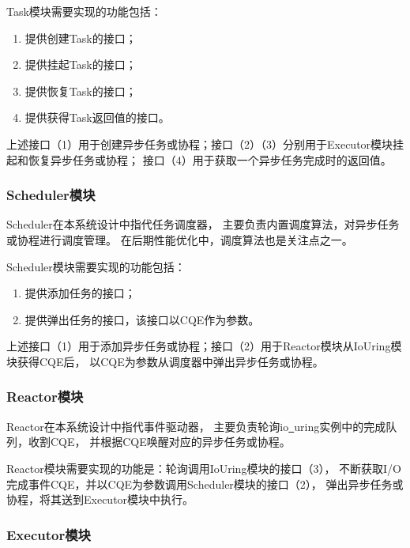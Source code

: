 \documentclass[supercite]{HustGraduPaper}
\theoremstyle{definition}
\begin{document}
Task模块需要实现的功能包括：

\begin{enumerate}
  \item 提供创建Task的接口；
  \item 提供挂起Task的接口；
  \item 提供恢复Task的接口；
  \item 提供获得Task返回值的接口。
\end{enumerate}

上述接口（1）用于创建异步任务或协程；接口（2）（3）分别用于Executor模块挂起和恢复异步任务或协程；
接口（4）用于获取一个异步任务完成时的返回值。\par

\subsubsection{Scheduler模块}

Scheduler在本系统设计中指代任务调度器，
主要负责内置调度算法，对异步任务或协程进行调度管理。
在后期性能优化中，调度算法也是关注点之一。\par

Scheduler模块需要实现的功能包括：

\begin{enumerate}
  \item 提供添加任务的接口；
  \item 提供弹出任务的接口，该接口以CQE作为参数。
\end{enumerate}

上述接口（1）用于添加异步任务或协程；接口（2）用于Reactor模块从IoUring模块获得CQE后，
以CQE为参数从调度器中弹出异步任务或协程。\par

\subsubsection{Reactor模块}

Reactor在本系统设计中指代事件驱动器，
主要负责轮询io\underline{~}uring实例中的完成队列，收割CQE，
并根据CQE唤醒对应的异步任务或协程。\par

Reactor模块需要实现的功能是：轮询调用IoUring模块的接口（3），
不断获取I/O完成事件CQE，并以CQE为参数调用Scheduler模块的接口（2），
弹出异步任务或协程，将其送到Executor模块中执行。\par

\subsubsection{Executor模块}
\end{document}
